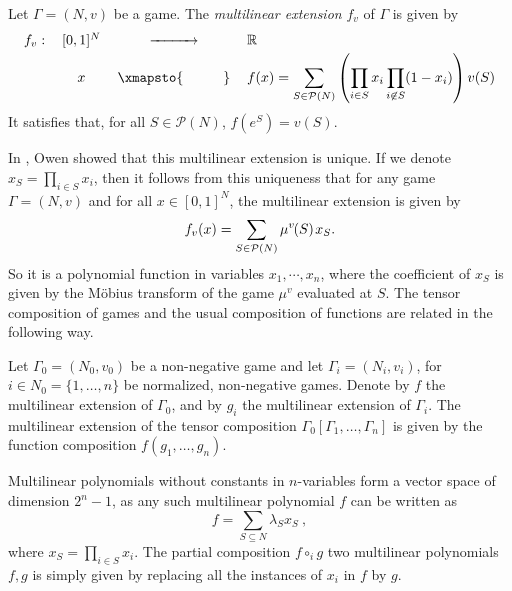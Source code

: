 \documentclass[a4paper,12pt]{amsart}
\begin{document}
\begin{definition}
    Let $\Gamma = (N, v)$ be a game. The \emph{multilinear extension} $f_v$ of $\Gamma$ is given by 
    \[ 
    \begin{tabular}{lccl}
    $f_v:$ & $[0, 1]^N$ & $\xrightarrow{\hspace{1cm}}$ & $\mathbb{R}$ \\[0.1cm]
    & $x$ & $\xmapsto{\hspace{1cm}}$ & $\displaystyle f(x) = \sum_{S \in \mathcal{P}(N)} \left( \prod_{i \in S} x_i \prod_{i \not \in S} (1-x_i) \right) v(S)$
    \end{tabular} 
    \]
    It satisfies that, for all $S \in \mathcal{P}(N)$, $f(e^S) = v(S)$. 
\end{definition}

In \cite[Last Theorem]{OwenMultilinear}, Owen showed that this multilinear extension is unique. If we denote $x_S = \prod_{i \in S} x_i$, then it follows from this uniqueness that for any game $\Gamma = (N, v)$ and for all $x \in [0, 1]^N$, the multilinear extension is given by
    \[
    f_v(x) = \sum_{S \in \mathcal{P}(N)} \mu^v \hspace{-1pt} (S) \hspace{1pt} x_S.
    \]
So it is a polynomial function in variables $x_1,\cdots, x_n$, where the coefficient of $x_S$ is given by the Möbius transform of the game $\mu^v$ evaluated at $S$. The tensor composition of games and the usual composition of functions are related in the following way. 

\begin{theorem}\label{th: stability-by-comp}
Let $\Gamma_0 = (N_0, v_0)$ be a non-negative game and let $\Gamma_i = (N_i, v_i)$, for $i \in N_0 = \{1, \ldots, n\}$ be normalized, non-negative games. Denote by $f$ the multilinear extension of $\Gamma_0$, and by $g_i$ the multilinear extension of $\Gamma_i$. The multilinear extension of the tensor composition $\Gamma_0[\Gamma_1, \ldots, \Gamma_n]$ is given by the function composition $f(g_1, \ldots, g_n)$.
\end{theorem}

Multilinear polynomials without constants in $n$-variables form a vector space of dimension $2^n -1$, as any such multilinear polynomial $f$ can be written as 
\[
f = \sum_{S \subseteq N} \lambda_S x_S~,  
\]
where $x_S = \prod_{i \in S} x_i$. The partial composition $f \circ_i g$ two multilinear polynomials $f, g$ is simply given by replacing all the instances of $x_i$ in $f$ by $g$. 
\end{document}

